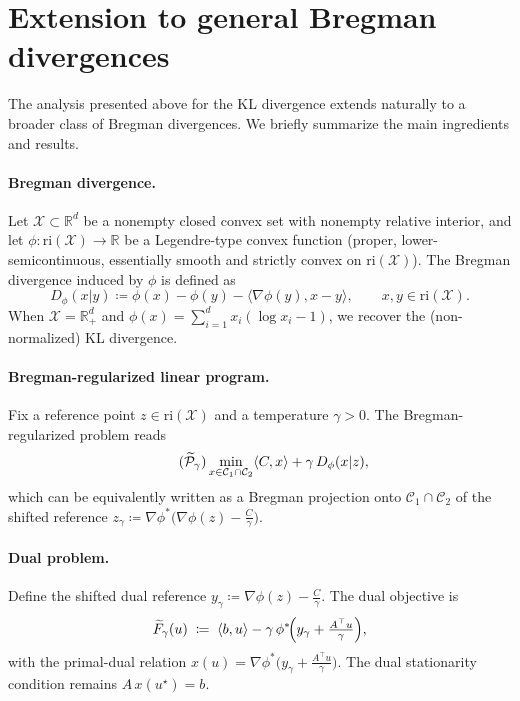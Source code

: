 \documentclass{article}
\newcommand{\dotp}[2]{\langle #1,#2 \rangle}
\theoremstyle{plain}
\newcommand{\mc}[1]{\mathcal{#1}}
\newcommand{\eqdef}{\coloneqq}
\newcommand{\RR}{\mathbb{R}}
\newcommand{\Cc}{\mathcal{C}}
\newcommand{\Xx}{\mathcal{X}}
\begin{document}
\section{Extension to general Bregman divergences}
\label{app-app:general-bregman}


The analysis presented above for the KL divergence extends naturally to a broader class of Bregman divergences. We briefly summarize the main ingredients and results.

\paragraph{Bregman divergence.}
Let $\Xx\subset \RR^d$ be a nonempty closed convex set with nonempty relative interior, and let $\phi:\mathrm{ri}(\Xx)\to \RR$ be a Legendre-type convex function (proper, lower-semicontinuous, essentially smooth and strictly convex on $\mathrm{ri}(\Xx)$).
The Bregman divergence induced by $\phi$ is defined as
\[
  D_\phi(x|y)
  \eqdef
  \phi(x)-\phi(y)-\dotp{\nabla\phi(y)}{x-y},
  \qquad x,y\in \mathrm{ri}(\Xx).
\]
When $\Xx=\RR^d_{+}$ and $\phi(x)=\sum_{i=1}^d x_i(\log x_i-1)$, we recover the (non-normalized) KL divergence.

\paragraph{Bregman-regularized linear program.}
Fix a reference point $z\in \mathrm{ri}(\Xx)$ and a temperature $\gamma>0$.
The Bregman-regularized problem reads
\begin{equation}\label{app-eq:bregman-penalized}
  \tag{$\widetilde{\mc P}_{\gamma}$}
  \min_{x\in \Cc_{1}\cap \Cc_{2}}
  \dotp{C}{x}+\gamma\,D_\phi(x|z),
\end{equation}
which can be equivalently written as a Bregman projection onto $\Cc_1\cap\Cc_2$ of the shifted reference $z_\gamma \eqdef \nabla \phi^\ast\!\bigl(\nabla\phi(z)-\tfrac{C}{\gamma}\bigr)$.

\paragraph{Dual problem.}
Define the shifted dual reference $y_\gamma \coloneqq \nabla \phi(z)-\tfrac{C}{\gamma}$.
The dual objective is
\[
  \widetilde{F}_\gamma(u)
  \;\coloneqq\;
  \langle b,u\rangle
  -
  \gamma\,\phi^\ast\!\Bigl(y_\gamma+\tfrac{A^\top u}{\gamma}\Bigr),
\]
with the primal-dual relation $x(u) = \nabla \phi^\ast\!\bigl(y_\gamma+\tfrac{A^\top u}{\gamma}\bigr)$.
The dual stationarity condition remains $A\,x(u^\star)=b$.
\end{document}
